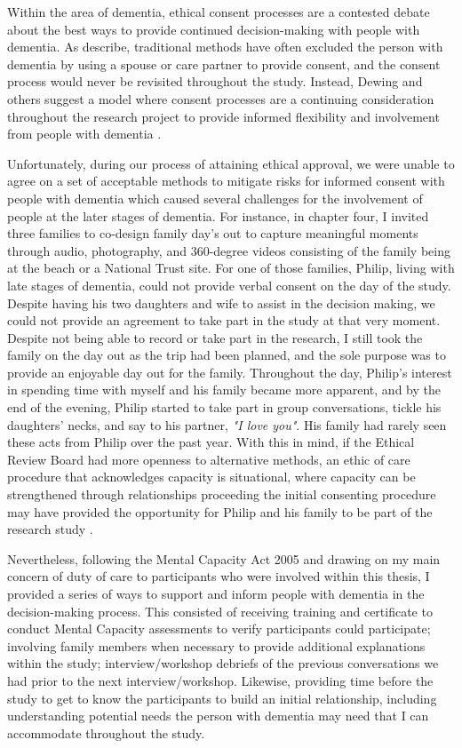 Within the area of dementia, ethical consent processes are a contested debate about the best ways to provide continued decision-making with people with dementia. As \cite{dewing_participatory_2007} describe, traditional methods have often excluded the person with dementia by using a spouse or care partner to provide consent, and the consent process would never be revisited throughout the study. Instead, Dewing and others suggest a model where consent processes are a continuing consideration throughout the research project to provide informed flexibility and involvement from people with dementia \citep{dewing_participatory_2007,slaughter2007consent,mckeown_actively_2009}. 

Unfortunately, during our process of attaining ethical approval, we were unable to agree on a set of acceptable methods to mitigate risks for informed consent with people with dementia which caused several challenges for the involvement of people at the later stages of dementia. For instance, in chapter four, I invited three families to co-design family day's out to capture meaningful moments through audio, photography, and 360-degree videos consisting of the family being at the beach or a National Trust site. For one of those families, Philip, living with late stages of dementia, could not provide verbal consent on the day of the study. Despite having his two daughters and wife to assist in the decision making, we could not provide an agreement to take part in the study at that very moment. 
Despite not being able to record or take part in the research, I still took the family on the day out as the trip had been planned, and the sole purpose was to provide an enjoyable day out for the family. Throughout the day, Philip's interest in spending time with myself and his family became more apparent, and by the end of the evening, Philip started to take part in group conversations, tickle his daughters' necks, and say to his partner, \textit{"I love you"}. His family had rarely seen these acts from Philip over the past year. With this in mind, if the Ethical Review Board had more openness to alternative methods, an ethic of care procedure that acknowledges capacity is situational, where capacity can be strengthened through relationships proceeding the initial consenting procedure may have provided the opportunity for Philip and his family to be part of the research study \citep{lloyd2004mortality}.

Nevertheless, following the Mental Capacity Act 2005 \citep{oyebode_mental_2005} and drawing on my main concern of duty of care to participants who were involved within this thesis, I provided a series of ways to support and inform people with dementia in the decision-making process. This consisted of receiving training and certificate to conduct Mental Capacity assessments to verify participants could participate; involving family members when necessary to provide additional explanations within the study; interview/workshop debriefs of the previous conversations we had prior to the next interview/workshop. Likewise, providing time before the study to get to know the participants to build an initial relationship, including understanding potential needs the person with dementia may need that I can accommodate throughout the study. 

